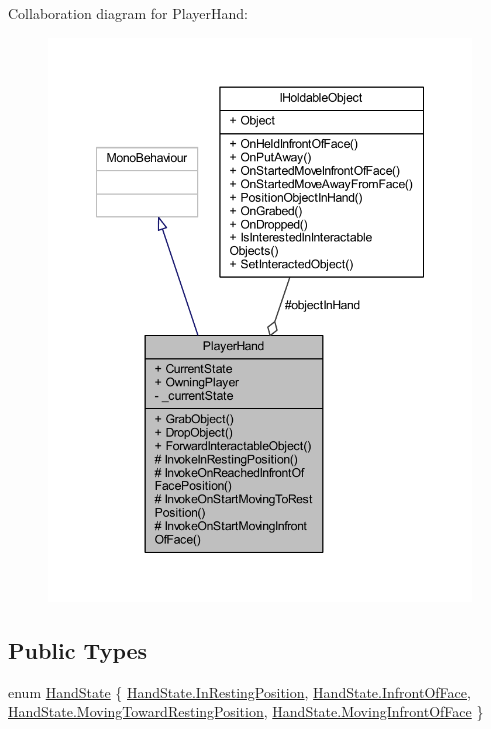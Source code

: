 Collaboration diagram for Player\+Hand\+:
\nopagebreak
\begin{figure}[H]
\begin{center}
\leavevmode
\includegraphics[width=348pt]{class_player_hand__coll__graph}
\end{center}
\end{figure}
\subsection*{Public Types}
\begin{DoxyCompactItemize}
\item 
enum \mbox{\hyperlink{class_player_hand_a1af76750da713cbc88856161d8d5ac0e}{Hand\+State}} \{ \mbox{\hyperlink{class_player_hand_a1af76750da713cbc88856161d8d5ac0eae9472019d82c6986ba42e1c6c9ddd812}{Hand\+State.\+In\+Resting\+Position}}, 
\mbox{\hyperlink{class_player_hand_a1af76750da713cbc88856161d8d5ac0ea0ffcf44fe0ab61c236ab3692a7cb3a22}{Hand\+State.\+Infront\+Of\+Face}}, 
\mbox{\hyperlink{class_player_hand_a1af76750da713cbc88856161d8d5ac0eae19d086cff66ea84fd45f01a2122af60}{Hand\+State.\+Moving\+Toward\+Resting\+Position}}, 
\mbox{\hyperlink{class_player_hand_a1af76750da713cbc88856161d8d5ac0eac9696ab2c297170cfe81d7ace9f096a6}{Hand\+State.\+Moving\+Infront\+Of\+Face}}
 \}
\end{DoxyCompactItemize}
